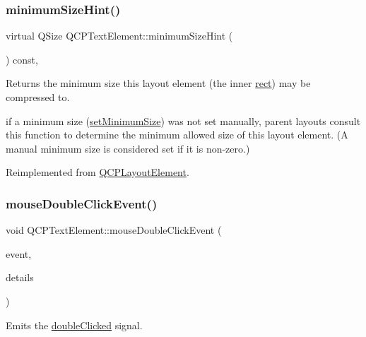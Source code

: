 \subsubsection{\texorpdfstring{minimum\+Size\+Hint()}{minimumSizeHint()}\hspace{0.1cm}{\footnotesize\ttfamily [2/2]}}
{\footnotesize\ttfamily virtual Q\+Size Q\+C\+P\+Text\+Element\+::minimum\+Size\+Hint (\begin{DoxyParamCaption}{ }\end{DoxyParamCaption}) const\hspace{0.3cm}{\ttfamily [protected]}, {\ttfamily [virtual]}}

Returns the minimum size this layout element (the inner \hyperlink{class_q_c_p_layout_element_a208effccfe2cca4a0eaf9393e60f2dd4}{rect}) may be compressed to.

if a minimum size (\hyperlink{class_q_c_p_layout_element_a5dd29a3c8bc88440c97c06b67be7886b}{set\+Minimum\+Size}) was not set manually, parent layouts consult this function to determine the minimum allowed size of this layout element. (A manual minimum size is considered set if it is non-\/zero.) 

Reimplemented from \hyperlink{class_q_c_p_layout_element_ab3fdb5c9a5189bb2dac10d4d25329cd8}{Q\+C\+P\+Layout\+Element}.

\mbox{\label{class_q_c_p_text_element_a2272ff775ab385f612e9fd39773de7c0}} 
\subsubsection{\texorpdfstring{mouse\+Double\+Click\+Event()}{mouseDoubleClickEvent()}\hspace{0.1cm}{\footnotesize\ttfamily [1/2]}}
{\footnotesize\ttfamily void Q\+C\+P\+Text\+Element\+::mouse\+Double\+Click\+Event (\begin{DoxyParamCaption}\item[{Q\+Mouse\+Event $\ast$}]{event,  }\item[{const Q\+Variant \&}]{details }\end{DoxyParamCaption})\hspace{0.3cm}{\ttfamily [virtual]}}

Emits the \hyperlink{class_q_c_p_text_element_a9c6fd27ae8a7c3a02df7a6bbd3509e40}{double\+Clicked} signal.


